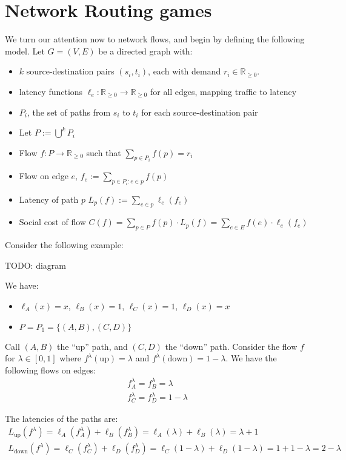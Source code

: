 \section{Network Routing games}
We turn our attention now to network flows, and begin by defining the following
model. Let $G=(V,E)$ be a directed graph with:
\begin{itemize}
	\item $k$ source-destination pairs $(s_i, t_i)$, each with demand $r_i \in \mathbb{R}_{\ge 0}$.
	\item latency functions $\ell_e : \mathbb{R}_{\ge 0} \rightarrow
		\mathbb{R}_{\ge 0}$ for all edges, mapping traffic to latency
	\item $P_i$, the set of paths from $s_i$ to $t_i$ for each
		source-destination pair
	\item Let $P := \bigcup^k P_i$
	\item Flow $f : P \rightarrow \mathbb{R}_{\ge 0}$ such that $\sum_{p \in
		P_i} f(p) = r_i$
	\item Flow on edge $e$, $f_e := \sum_{p \in P_i : e \in p} f(p)$
	\item Latency of path $p$ $L_p (f) := \sum_{e \in p} \ell_e (f_e)$
	\item Social cost of flow $C(f) = \sum_{p \in P} f(p) \cdot L_p(f) =
		\sum_{e \in E} f(e) \cdot \ell_e (f_e)$
\end{itemize}

Consider the following example:

TODO: diagram

We have:
\begin{itemize}
	\item $\ell_A(x) = x$, $\ell_B(x) = 1$, $\ell_C(x) = 1$, $\ell_D(x) = x$
	\item $P = P_1 = \{ (A,B), (C,D) \}$
\end{itemize}

Call $(A,B)$ the ``up'' path, and $(C,D)$ the ``down'' path. Consider the flow
$f$ for $\lambda \in [0,1]$ where $f^\lambda(\text{up}) = \lambda$ and
$f^\lambda(\text{down}) = 1 - \lambda$. We have the following flows on edges:
\begin{equation*}
	\begin{gathered}
		f_A^\lambda = f_B^\lambda = \lambda \\
		f_C^\lambda = f_D^\lambda = 1 - \lambda
	\end{gathered}
\end{equation*}

The latencies of the paths are:
\begin{equation*}
	\begin{gathered}
		L_\text{up}(f^\lambda) = \ell_A(f_A^\lambda) + \ell_B(f_B^\lambda) = \ell_A(\lambda) + \ell_B(\lambda) = \lambda + 1 \\
		L_\text{down}(f^\lambda) = \ell_C(f_C^\lambda) + \ell_D(f_D^\lambda) = \ell_C(1 - \lambda) + \ell_D(1 - \lambda) = 1 + 1 - \lambda = 2 - \lambda
	\end{gathered}
\end{equation*}

